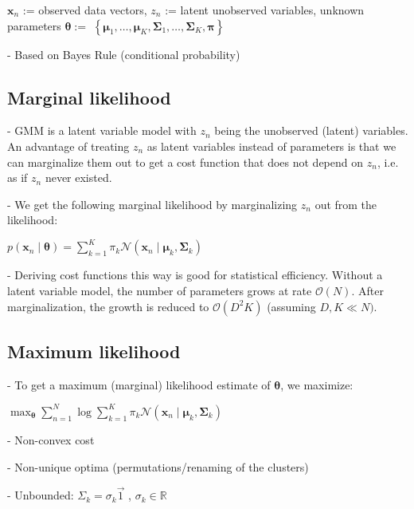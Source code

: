 $\mathbf{x}_{n}$ := observed data vectors, $z_{n}$ := latent unobserved variables, unknown parameters $\boldsymbol{\theta}:=$ $\left\{\boldsymbol{\mu}_{1}, \ldots, \boldsymbol{\mu}_{K}, \boldsymbol{\Sigma}_{1}, \ldots, \boldsymbol{\Sigma}_{K}, \boldsymbol{\pi}\right\}$

- Based on Bayes Rule (conditional probability) 

\subsection*{Marginal likelihood}
- GMM is a latent variable model with $z_{n}$ being the unobserved (latent) variables. An advantage of treating $z_{n}$ as latent variables instead of parameters is that we can marginalize them out to get a cost function that does not depend on $z_{n}$, i.e. as if $z_{n}$ never existed.

- We get the following marginal likelihood by marginalizing $z_{n}$ out from the likelihood:

$p\left(\mathbf{x}_{n} \mid \boldsymbol{\theta}\right)=\sum_{k=1}^{K} \pi_{k} \mathcal{N}\left(\mathbf{x}_{n} \mid \boldsymbol{\mu}_{k}, \boldsymbol{\Sigma}_{k}\right)$


- Deriving cost functions this way is good for statistical efficiency. Without a latent variable model, the number of parameters grows at rate $\mathcal{O}(N)$. After marginalization, the growth is reduced to $\mathcal{O}\left(D^{2} K\right)$ (assuming $D, K \ll N)$.

\subsection*{Maximum likelihood}
- To get a maximum (marginal) likelihood estimate of $\boldsymbol{\theta}$, we maximize:

$
\max _{\boldsymbol{\theta}} \sum_{n=1}^{N} \log \sum_{k=1}^{K} \pi_{k} \mathcal{N}\left(\mathbf{x}_{n} \mid \boldsymbol{\mu}_{k}, \boldsymbol{\Sigma}_{k}\right)
$

- Non-convex cost

- Non-unique optima (permutations/renaming of the clusters)

- Unbounded: $\Sigma_k={\sigma_k}\overrightarrow{1}$ , $\sigma_k \in \mathbb{R}$

